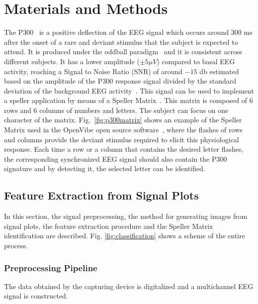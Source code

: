 \documentclass[utf8]{frontiersSCNS} %
\begin{document}
\section{Materials and Methods}

The P300~\citep{Farwell1988,Knuth2006} is a positive deflection of the EEG signal which occurs around $300$ ms after the onset of a rare and deviant stimulus that the subject is expected to attend.  It is produced under the oddball paradigm~\citep{WolpawJonathanR2012} and it is consistent across different subjects. It has a lower amplitude  ($\pm 5 \mu V $) compared to basal EEG activity, reaching a Signal to Noise Ratio (SNR) of around $-15$ db estimated based on the amplitude of the P300 response signal divided by the standard deviation of the background EEG activity~\citep{Hu2010}.  This signal can be used to implement a speller application by means of a Speller Matrix~\citep{Farwell1988}. This matrix is composed of 6 rows and 6 columns of numbers and letters. The subject can focus on one character of the matrix. Fig.~\ref{fig:p300matrix} shows an example of the Speller Matrix used in the OpenVibe open source software~\citep{Renard2010}, where the flashes of rows and columns provide the deviant stimulus required to elicit this physiological response.   Each time a row or a column that contains the desired letter flashes, the corresponding synchronized EEG signal should also contain the P300 signature and by detecting it, the selected letter can be identified.

\subsection{Feature Extraction from Signal Plots} \label{Feature}

In this section, the signal preprocessing, the method for generating images from signal plots, the feature extraction procedure and the Speller Matrix identification are described.  Fig. \ref{fig:classification} shows a scheme of the entire process.

\subsubsection{Preprocessing Pipeline} \label{Pipeline}

The data obtained by the capturing device is digitalized and a multichannel EEG signal is constructed.

\end{document}
